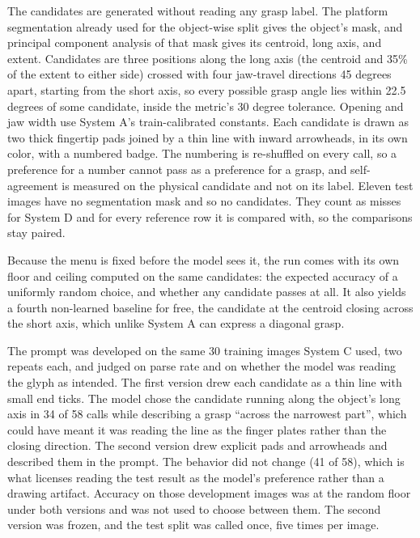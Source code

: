 \documentclass[12pt,letterpaper]{article}
\begin{document}
The candidates are generated without reading any grasp label. The
platform segmentation already used for the object-wise split gives the
object's mask, and principal component analysis of that mask gives its
centroid, long axis, and extent. Candidates are three positions along
the long axis (the centroid and 35\% of the extent to either side)
crossed with four jaw-travel directions 45 degrees apart, starting from
the short axis, so every possible grasp angle lies within 22.5 degrees
of some candidate, inside the metric's 30 degree tolerance. Opening and
jaw width use System A's train-calibrated constants. Each candidate is
drawn as two thick fingertip pads joined by a thin line with inward
arrowheads, in its own color, with a numbered badge. The numbering is
re-shuffled on every call, so a preference for a number cannot pass as
a preference for a grasp, and self-agreement is measured on the
physical candidate and not on its label. Eleven test images have no
segmentation mask and so no candidates. They count as misses for
System D and for every reference row it is compared with, so the
comparisons stay paired.

Because the menu is fixed before the model sees it, the run comes with
its own floor and ceiling computed on the same candidates: the expected
accuracy of a uniformly random choice, and whether any candidate passes
at all. It also yields a fourth non-learned baseline for free, the
candidate at the centroid closing across the short axis, which unlike
System A can express a diagonal grasp.

The prompt was developed on the same 30 training images System C used,
two repeats each, and judged on parse rate and on whether the model was
reading the glyph as intended. The first version drew each candidate as
a thin line with small end ticks. The model chose the candidate running
along the object's long axis in 34 of 58 calls while describing a grasp
``across the narrowest part'', which could have meant it was reading the
line as the finger plates rather than the closing direction. The second
version drew explicit pads and arrowheads and described them in the
prompt. The behavior did not change (41 of 58), which is what licenses
reading the test result as the model's preference rather than a
drawing artifact. Accuracy on those development images was at the
random floor under both versions and was not used to choose between
them. The second version was frozen, and the test split was called
once, five times per image.
\end{document}
